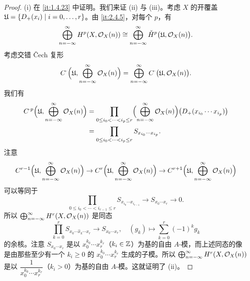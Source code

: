 \begin{proof}
(i) 在 \ref{it:1.4.23} 中证明。我们来证 (ii) 与 (iii)。考虑 $X$ 的开覆盖 $\mathfrak{U}=\{D_+(x_i)\mid i=0,\dots,r\}$。由 \ref{it:2.4.5}，对每个 $p$，有
\[
\bigoplus_{n=-\infty}^{\infty}H^p(X,\mathcal{O}_X(n))\cong
\bigoplus_{n=-\infty}^{\infty}\check{H}^p\bigl(\mathfrak{U},\mathcal{O}_X(n)\bigr).
\]
考虑交错 \v{C}ech 复形
\[
C^{\cdot}\Bigl(\mathfrak{U},\bigoplus_{n=-\infty}^{\infty}\mathcal{O}_X(n)\Bigr)
=\bigoplus_{n=-\infty}^{\infty}C^{\cdot}\bigl(\mathfrak{U},\mathcal{O}_X(n)\bigr).
\]
我们有
\[
\begin{aligned}
C^{\cdot p}\Bigl(\mathfrak{U},\bigoplus_{n=-\infty}^{\infty}\mathcal{O}_X(n)\Bigr)
&=\prod_{0\le i_0<\cdots<i_p\le r}\Bigl(\bigoplus_{n=-\infty}^{\infty}\mathcal{O}_X(n)\Bigr)
\bigl(D_+(x_{i_0}\cdots x_{i_p})\bigr)\\
&=\prod_{0\le i_0<\cdots<i_p\le r}S_{x_{i_0}\cdots x_{i_p}}.
\end{aligned}
\]
注意
\[
C^{r-1}\Bigl(\mathfrak{U},\bigoplus_{n=-\infty}^{\infty}\mathcal{O}_X(n)\Bigr)\to
C^r\Bigl(\mathfrak{U},\bigoplus_{n=-\infty}^{\infty}\mathcal{O}_X(n)\Bigr)\to
C^{r+1}\Bigl(\mathfrak{U},\bigoplus_{n=-\infty}^{\infty}\mathcal{O}_X(n)\Bigr)
\]
可以等同于
\[
\prod_{0\le i_0<\cdots<i_{r-1}\le r}S_{x_{i_0}\cdots x_{i_{r-1}}}\to S_{x_0\cdots x_r}\to 0.
\]
所以 $\bigoplus_{n=-\infty}^{\infty}H^r(X,\mathcal{O}_X(n))$ 是同态
\[
\prod_{k=0}^{r}S_{x_0\cdots\hat{x}_k\cdots x_r}\to S_{x_0\cdots x_r},\quad
(g_k)\mapsto\sum_{k=0}^{r}(-1)^kg_k
\]
的余核。注意 $S_{x_0\cdots x_r}$ 是以 $x_0^{k_0}\cdots x_r^{k_r}$（$k_i\in\mathbb{Z}$）为基的自由 $A$-模，而上述同态的像是由那些至少有一个 $k_i\ge 0$ 的 $x_0^{k_0}\cdots x_r^{k_r}$ 生成的子模。所以 $\bigoplus_{n=-\infty}^{\infty}H^r(X,\mathcal{O}_X(n))$ 是以 $\dfrac{1}{x_0^{k_0}\cdots x_r^{k_r}}$（$k_i>0$）为基的自由 $A$-模。这就证明了 (ii)。


\end{proof}
